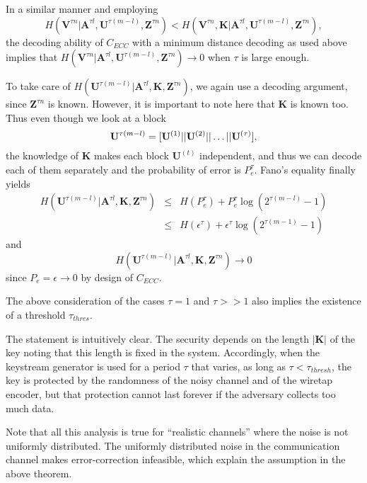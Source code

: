 \documentclass{article}[11pt]
\newcommand{\am}{\mathbf{A}}
\newcommand{\km}{\mathbf{K}}
\newcommand{\um}{\mathbf{U}}
\newcommand{\vm}{\mathbf{V}}
\newcommand{\zm}{\mathbf{Z}}
\newenvironment{proof}{\noindent {\bf Proof. \ }}{\hfill \vrule height 2pt depth 4pt width 6pt\par\noindent}
\begin{document}
\begin{proof}
In a similar manner and employing
\begin{displaymath}
H(\vm^{\tau n}|\am^{\tau l}\!,\um^{\tau(m-l)}\!,\zm^{\tau n}) <
H(\vm^{\tau n}\!, \km |\am^{\tau l}\!,\um^{\tau(m-l)}\!,\zm^{\tau n}),
\end{displaymath}
the decoding ability of $C_{ECC}$ with a minimum distance
decoding as used above implies that
$H(\vm^{\tau n}|\am^{\tau l},\um^{\tau(m-l)},\zm^{\tau n}) \rightarrow 0$ when
$\tau$ is large enough.

To take care of $H(\um^{\tau(m-l)}|\am^{\tau l},\km,\zm^{\tau n})$,
we again use a decoding argument, since $\zm^{\tau n}$ is known.
However, it is important to note here that $\km$ is known too.
Thus even though we look at a block
\[
{\bf U}^{\tau (m-l)}=[{\bf U}^{(1)}||{\bf U}^{(2)}||\ldots||{\bf
U}^{(\tau)}],
\]
the knowledge of $\km$ makes each block $\um^{(t)}$ independent,
and thus we can decode each of them separately and the probability
of error is $P_e^\tau$. Fano's equality finally yields
\begin{eqnarray*}
H(\um^{\tau(m-l)}|\am^{\tau l},\km,\zm^{\tau n})
\!\!\!&\leq\!\!\! &H(P_e^\tau)+P_e^\tau\log(2^{\tau(m-l)}-1)\\
\!\!\!&\leq\!\!\! &H(\epsilon^\tau)+\epsilon^\tau\log(2^{\tau(m-1)}-1)
\end{eqnarray*}
and
\begin{equation}\label{eq:F}
H(\um^{\tau(m-l)}|\am^{\tau l},\km,\zm^{\tau n}) \rightarrow  0
\end{equation}
since $P_e=\epsilon \rightarrow 0$ by design of $C_{ECC}$.

The above consideration of the cases $\tau=1$ and $\tau >> 1$ also
implies the existence of a threshold $\tau_{thres}$.

\end{proof}

The statement is intuitively clear. The security depends on the
length $|\km|$ of the key noting that this length is fixed in the
system. Accordingly, when the keystream generator is used for a
period $\tau$ that varies, as long as $\tau<\tau_{thresh}$, the
key is protected by the randomness of the noisy channel and of the
wiretap encoder, but that protection cannot last forever if the
adversary collects too much data.

Note that all this analysis is true for ``realistic channels'' where the
noise is not uniformly distributed. The uniformly distributed noise in the
communication channel makes error-correction infeasible, which
explain the assumption in the above theorem.
\end{document}
